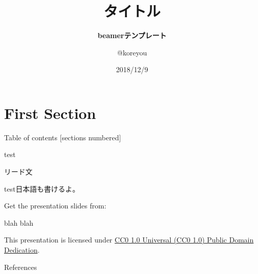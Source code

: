 

\title{\bfseries タイトル}
\subtitle{\bfseries beamerテンプレート}
\author{@koreyou}
\date[]{2018/12/9}




\frame{\titlepage}

\section{First Section}
\frame[standout]{\insertsection}

\begin{frame}{Table of contents}
  [sections numbered]
  \tableofcontents[hideallsubsections]
\end{frame}

\begin{frame}[t]{test}
  \begin{lead}
    リード文
  \end{lead}
  test\cite{knuth}日本語も書けるよ。
\end{frame}

\begin{frame}

  Get the presentation slides from:

  \begin{center}blah blah\end{center}

  This presentation is licensed under
    \href{https://creativecommons.org/publicdomain/zero/1.0/}{
    CC0 1.0 Universal (CC0 1.0) Public Domain Dedication}.

  \begin{center}\cczero\end{center}

\end{frame}

\begin{frame}[allowframebreaks]{References}
  \printbibliography[heading=none]
\end{frame}



